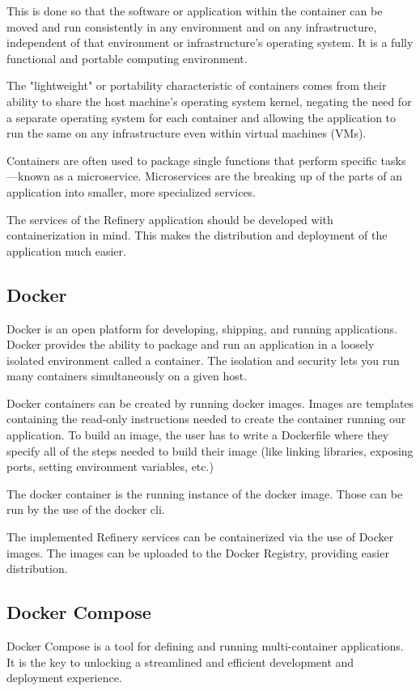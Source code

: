 	This is done so that the software or application within the container can be moved and run consistently 
	in any environment and on any infrastructure, independent of that environment or infrastructure’s 
	operating system. It is a fully functional 
	and portable computing environment.

	The "lightweight" or portability characteristic of containers comes from their ability to share 
	the host machine’s operating system kernel, negating the need for a separate operating system for 
	each container and allowing the application to run the same on any infrastructure 
	even within virtual machines (VMs).

	Containers are often used to package single functions that perform specific tasks—known as a microservice. 
	Microservices are the breaking up of the parts of an application into smaller, more specialized services. 

	The services of the Refinery application should be developed with containerization in mind. This makes 
	the distribution and deployment of the application much easier.

	\subsection{Docker} \label{backgdocker}
		Docker \cite{docker} is an open platform for developing, shipping, and running applications. 
		Docker provides the ability to package and run an application in a loosely isolated environment 
		called a container. The isolation and security lets you run many containers simultaneously 
		on a given host.

		Docker containers can be created by running docker images. Images are templates 
		containing the read-only instructions needed 
		to create the container running our application. To build an image, the user has to write a Dockerfile
		where they specify all of the steps needed to build their image (like linking libraries, exposing ports, 
		setting environment variables, etc.)

		The docker container is the running instance of the docker image. Those can be run by the use of the docker cli.

		The implemented Refinery services can be containerized via the use of Docker images. The images can be uploaded to the 
		Docker Registry, providing easier distribution.


	\subsection{Docker Compose} \label{backgdockercompose}
		Docker Compose \cite{dockercompose} is a tool for defining and running multi-container applications. 
		It is the key to unlocking a streamlined and efficient development and deployment experience.

